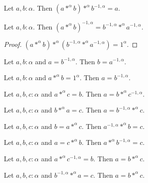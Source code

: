 \documentclass{article}
\begin{document}
\begin{forthel}
\begin{lemma} Let $a,b : \alpha$. Then 
$(a *^{\alpha} b) *^{\alpha} b^{-1,\alpha} = a$.
\end{lemma}


\begin{lemma} Let $a,b : \alpha$. Then
$(a *^{\alpha} b)^{-1,\alpha} = b^{-1,\alpha} *^{\alpha} a^{-1,\alpha}$.
\end{lemma}
\begin{proof} 
$(a *^{\alpha} b) *^{\alpha} (b^{-1,\alpha} *^{\alpha} a^{-1,\alpha})
= 1^{\alpha}$.
\end{proof}

\begin{lemma} Let $a,b : \alpha$ and $a = b^{-1,\alpha}$.
Then $b = a^{-1,\alpha}$.
\end{lemma}

\begin{lemma} Let $a,b : \alpha$ and 
$a *^{\alpha} b = 1^{\alpha}$. Then $a = b^{-1,\alpha}$.
\end{lemma}

\begin{lemma} Let $a,b,c : \alpha$ and 
$a *^{\alpha} c = b$. Then $a = b *^{\alpha} c^{-1,\alpha}$.
\end{lemma}

\begin{lemma} Let $a,b,c : \alpha$ and 
$b *^{\alpha} a = c$. Then $a = b^{-1,\alpha} *^{\alpha} c$.
\end{lemma}

\begin{lemma} Let $a,b,c : \alpha$ and
$b = a *^{\alpha} c$. Then $a^{-1,\alpha} *^{\alpha} b = c$.
\end{lemma}

\begin{lemma} Let $a,b,c : \alpha$ and 
$a = c *^{\alpha} b$. Then $a *^{\alpha} b^{-1,\alpha} = c$.
\end{lemma}

\begin{lemma} Let $a,b,c : \alpha$ and 
$a *^{\alpha} c^{-1,\alpha} = b$. Then $a = b *^{\alpha} c$.
\end{lemma}

\begin{lemma} Let $a,b,c : \alpha$ and 
$b^{-1,\alpha} *^{\alpha} a = c$. Then $a = b *^{\alpha} c$.
\end{lemma}


\end{forthel}
\end{document}

